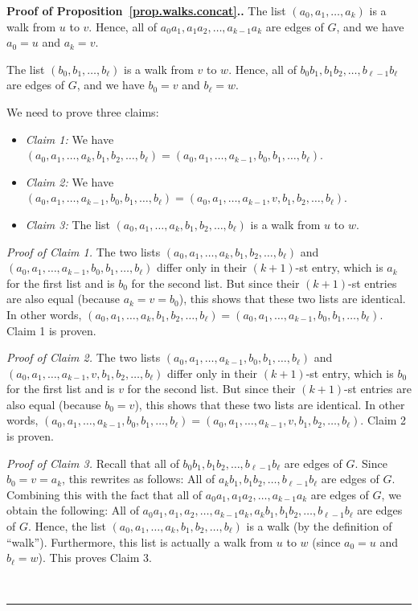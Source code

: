 \documentclass[numbers=enddot,12pt,final,onecolumn,notitlepage]{scrartcl}%
\theoremstyle{definition}
\newenvironment{proof}[1][Proof]{\noindent\textbf{#1.} }{\ \rule{0.5em}{0.5em}}
\newcommand{\tup}[1]{\left( #1 \right)}
\begin{document}
\begin{proof}[Proof of Proposition~\ref{prop.walks.concat}.]
The list $\tup{a_0, a_1, \ldots, a_k}$ is a walk from $u$ to $v$.
Hence, all of $a_0 a_1, a_1 a_2, \ldots, a_{k-1} a_k$ are edges of
$G$, and we have $a_0 = u$ and $a_k = v$.

The list $\tup{b_0, b_1, \ldots, b_\ell}$ is a walk from $v$ to $w$.
Hence, all of $b_0 b_1, b_1 b_2, \ldots, b_{\ell-1} b_\ell$ are edges
of $G$, and we have $b_0 = v$ and $b_\ell = w$.

We need to prove three claims:
\begin{itemize}
\item \textit{Claim 1:} We have
$\tup{a_0, a_1, \ldots, a_k, b_1, b_2, \ldots, b_\ell}
= \tup{a_0, a_1, \ldots, a_{k-1}, b_0, b_1, \ldots, b_\ell}$.
\item \textit{Claim 2:} We have
$\tup{a_0, a_1, \ldots, a_{k-1}, b_0, b_1, \ldots, b_\ell}
= \tup{a_0, a_1, \ldots, a_{k-1}, v, b_1, b_2, \ldots, b_\ell}$.
\item \textit{Claim 3:} The list
$\tup{a_0, a_1, \ldots, a_k, b_1, b_2, \ldots, b_\ell}$ is a walk
from $u$ to $w$.
\end{itemize}

\textit{Proof of Claim 1.} The two lists
$\tup{a_0, a_1, \ldots, a_k, b_1, b_2, \ldots, b_\ell}$
and \newline
$\tup{a_0, a_1, \ldots, a_{k-1}, b_0, b_1, \ldots, b_\ell}$
differ only in their $\tup{k+1}$-st entry, which is $a_k$ for the
first list and is $b_0$ for the second list. But since their
$\tup{k+1}$-st entries are also equal (because $a_k = v = b_0$),
this shows that these two lists are identical. In other words,
$\tup{a_0, a_1, \ldots, a_k, b_1, b_2, \ldots, b_\ell}
= \tup{a_0, a_1, \ldots, a_{k-1}, b_0, b_1, \ldots, b_\ell}$.
Claim 1 is proven.

\textit{Proof of Claim 2.} The two lists
$\tup{a_0, a_1, \ldots, a_{k-1}, b_0, b_1, \ldots, b_\ell}$
and \newline
$\tup{a_0, a_1, \ldots, a_{k-1}, v, b_1, b_2, \ldots, b_\ell}$
differ only in their $\tup{k+1}$-st entry, which is $b_0$ for the
first list and is $v$ for the second list. But since their
$\tup{k+1}$-st entries are also equal (because $b_0 = v$),
this shows that these two lists are identical. In other words,
$\tup{a_0, a_1, \ldots, a_{k-1}, b_0, b_1, \ldots, b_\ell}
= \tup{a_0, a_1, \ldots, a_{k-1}, v, b_1, b_2, \ldots, b_\ell}$.
Claim 2 is proven.

\textit{Proof of Claim 3.} Recall that all of
$b_0 b_1, b_1 b_2, \ldots, b_{\ell-1} b_\ell$ are edges of $G$.
Since $b_0 = v = a_k$, this rewrites as follows: All of
$a_k b_1, b_1 b_2, \ldots, b_{\ell-1} b_\ell$ are edges of $G$.
Combining this with the fact that all of
$a_0 a_1, a_1 a_2, \ldots, a_{k-1} a_k$ are edges of $G$,
we obtain the following: All of
$a_0 a_1, a_1, a_2, \ldots, a_{k-1} a_k,
a_k b_1, b_1 b_2, \ldots, b_{\ell-1} b_\ell$ are edges of $G$. Hence,
the list
$\tup{a_0, a_1, \ldots, a_k, b_1, b_2, \ldots, b_\ell}$ is a walk
(by the definition of ``walk''). Furthermore, this list is actually
a walk from $u$ to $w$ (since $a_0 = u$ and $b_\ell = w$). This
proves Claim 3.


\end{proof}
\end{document}
